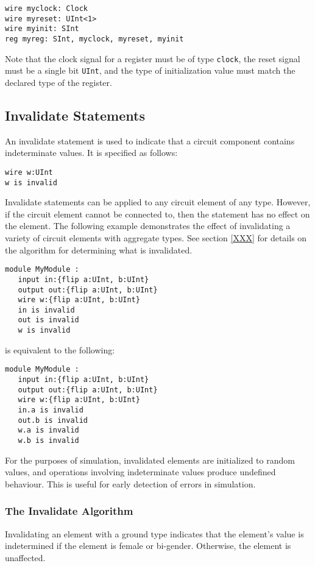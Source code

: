 \documentclass[12pt]{article}
\begin{document}
\begin{verbatim}
wire myclock: Clock
wire myreset: UInt<1>
wire myinit: SInt
reg myreg: SInt, myclock, myreset, myinit
\end{verbatim}

Note that the clock signal for a register must be of type \verb|clock|, the reset signal must be a single bit \verb|UInt|, and the type of initialization value must match the declared type of the register.

\subsection{Invalidate Statements}
An invalidate statement is used to indicate that a circuit component contains indeterminate values. It is specified as follows:

\begin{verbatim}
wire w:UInt
w is invalid
\end{verbatim}

Invalidate statements can be applied to any circuit element of any type. However, if the circuit element cannot be connected to, then the statement has no effect on the element. The following example demonstrates the effect of invalidating a variety of circuit elements with aggregate types. See section \ref{XXX} for details on the algorithm for determining what is invalidated.

\begin{verbatim}
module MyModule :
   input in:{flip a:UInt, b:UInt}
   output out:{flip a:UInt, b:UInt}
   wire w:{flip a:UInt, b:UInt}
   in is invalid
   out is invalid
   w is invalid
\end{verbatim}
is equivalent to the following:
\begin{verbatim}
module MyModule :
   input in:{flip a:UInt, b:UInt}
   output out:{flip a:UInt, b:UInt}
   wire w:{flip a:UInt, b:UInt}
   in.a is invalid
   out.b is invalid
   w.a is invalid
   w.b is invalid
\end{verbatim}

For the purposes of simulation, invalidated elements are initialized to random values, and operations involving indeterminate values produce undefined behaviour. This is useful for early detection of errors in simulation.

\subsubsection{The Invalidate Algorithm}
Invalidating an element with a ground type indicates that the element's value is indetermined if the element is female or bi-gender. Otherwise, the element is unaffected.
\end{document}
